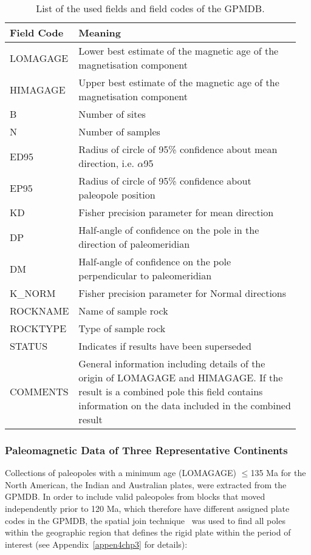 \begin{table}
\centering
\caption{List of the used fields and field codes of the GPMDB.}\label{tab-fld}
\begin{tabular}{p{0.16\linewidth} | p{0.79\linewidth}}
\toprule
Field Code & Meaning \\ \midrule
LOMAGAGE & Lower best estimate of the magnetic age of the magnetisation component \\
HIMAGAGE & Upper best estimate of the magnetic age of the magnetisation component \\
B & Number of sites \\
N & Number of samples \\
ED95 & Radius of circle of 95\% confidence about mean direction, i.e. $\alpha$95 \\
EP95 & Radius of circle of 95\% confidence about paleopole position \\
KD & Fisher precision parameter for mean direction \\
DP & Half-angle of confidence on the pole in the direction of paleomeridian \\
DM & Half-angle of confidence on the pole perpendicular to paleomeridian \\
K\_NORM & Fisher precision parameter for Normal directions \\
ROCKNAME & Name of sample rock \\
ROCKTYPE & Type of sample rock \\
STATUS & Indicates if results have been superseded \\
COMMENTS & General information including details of the origin of LOMAGAGE and
           HIMAGAGE\@. If the result is a combined pole this field contains information on the data included in the combined result \\
  \bottomrule
\end{tabular}
\end{table}

\subsubsection{Paleomagnetic Data of Three Representative Continents}

Collections of paleopoles with a minimum age (LOMAGAGE) $\leq$135 Ma for the
North American, the Indian and Australian
plates, were extracted from the GPMDB\@. In order to include valid paleopoles
from blocks that moved independently prior to 120 Ma, which therefore have
different assigned plate codes in the GPMDB, the spatial join
technique~\citep{J07} was used to find all poles within the geographic region
that defines the rigid plate within the period of interest (see
Appendix~\ref{appen4chp3} for details):

